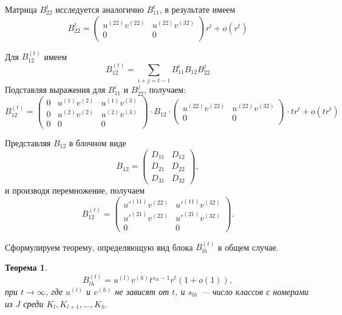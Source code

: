 \documentclass[11pt]{article}
\newtheorem{theorem}{Теорема}
\begin{document}
Матрица $B_{22}^t$ исследуется аналогично $B_{11}^t$, в результате имеем
\begin{equation}
    B_{22}^t = 
    \begin{pmatrix}
        u^{(22)} v^{(22)} & u^{(22)} v^{(32)} \\
        0 & 0
    \end{pmatrix}
    r^t + o(r^t)
\end{equation}

Для $B_{12}^{(t)}$ имеем
\begin{equation}
    B_{12}^{(t)} = \sum_{i + j = t-1} B_{11}^i B_{12} B_{22}^j
\end{equation}
Подставляя выражения для $B_{11}^i$ и $B_{22}^j$, получаем:
\begin{equation}
    B_{12}^{(t)} = 
    \begin{pmatrix}
        0 & u^{(1)} v^{(2)} & u^{(1)} v^{(3)} \\
        0 & u^{(2)} v^{(2)} & u^{(2)} v^{(3)} \\
        0 & 0 & 0
    \end{pmatrix}
    \cdot B_{12} \cdot
    \begin{pmatrix}
        u^{(22)} v^{(22)} & u^{(22)} v^{(32)} \\
        0 & 0
    \end{pmatrix}
    \cdot t r^t + o(t r^t)
\end{equation}

Представляя $B_{12}$ в блочном виде
\begin{equation}
    B_{12} = 
    \begin{pmatrix}
        D_{11} & D_{12} \\
        D_{21} & D_{22} \\
        D_{31} & D_{32}
    \end{pmatrix},
\end{equation}
и производя перемножение, получаем
\begin{equation}
    B_{12}^{(t)} = 
    \begin{pmatrix}
        u'^{(11)} v^{(22)} & u'^{(11)} v^{(32)} \\
        u'^{(21)} v^{(22)} & u'^{(21)} v^{(32)} \\
        0 & 0
    \end{pmatrix}.
\end{equation}

Сформулируем теорему, определяющую вид блока $B_{lh}^{(t)}$ в общем случае.
\begin{theorem}
    \begin{equation}
        B_{lh}^{(t)} = u^{(l)} v^{(h)} t^{s_{lh} - 1} r^t (1 + o(1)),
    \end{equation}
    при $t \rightarrow \infty$, где $u^{(l)}$ и $v^{(h)}$ не зависят от $t$, и $s_{lh}$ --- число классов с номерами из $J$ среди $K_l, K_{l+1}, \ldots, K_h$.
\end{theorem}
\end{document}

